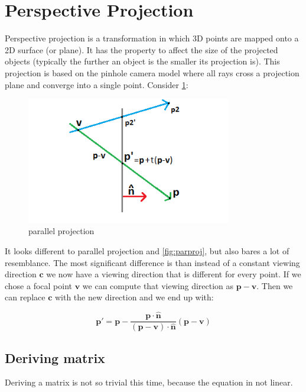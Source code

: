 \documentclass[]{report}   %
\begin{document}
\section{Perspective Projection}

Perspective projection is a transformation in which 3D points are mapped onto a 2D surface (or plane). It has the property to affect the size of the projected objects (typically the further an object is the smaller its projection is). This projection is based on the pinhole camera model where all rays cross a projection plane and converge into a single point. Consider \ref{fig:persproj}: 
\begin{figure}[htb]
\centering
\includegraphics[width=0.8\textwidth]{persp-projection-diagram}
\caption{parallel projection}
\label{fig:persproj}
\end{figure}

It looks different to parallel projection and \ref{fig:parproj}, but also bares a lot of resemblance. The most significant difference is than instead of a constant viewing direction \(\mathbf{c}\) we now have a viewing direction that is different for every point. If we chose a focal point \(\mathbf{v}\) we can compute that viewing direction as \(\mathbf{p}-\mathbf{v}\). Then we can replace \(\mathbf{c}\) with the new direction and we end up with:
\begin{mdframed}
\[
	\mathbf{p\prime} = \mathbf{p} - \frac{\mathbf{p} \cdot \mathbf{\hat{n}}}{(\mathbf{p}-\mathbf{v}) \cdot \mathbf{\hat{n}}} 
	(\mathbf{p}-\mathbf{v})
\]
\end{mdframed}


\subsection{Deriving matrix}

Deriving a matrix is not so trivial this time, because the equation in not linear.
\end{document}
